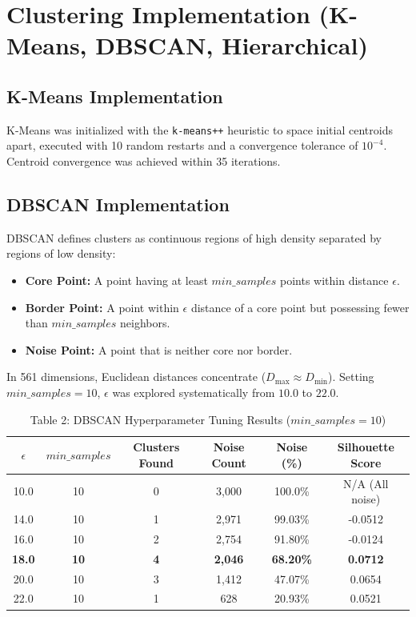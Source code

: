 \documentclass[12pt,a4paper]{article}
\begin{document}
\section{Clustering Implementation (K-Means, DBSCAN, Hierarchical)}

\subsection{K-Means Implementation}
K-Means was initialized with the \texttt{k-means++} heuristic to space initial centroids apart, executed with 10 random restarts and a convergence tolerance of $10^{-4}$. Centroid convergence was achieved within 35 iterations.

\subsection{DBSCAN Implementation}
DBSCAN defines clusters as continuous regions of high density separated by regions of low density:
\begin{itemize}
\item \textbf{Core Point:} A point having at least $min\_samples$ points within distance $\epsilon$.
\item \textbf{Border Point:} A point within $\epsilon$ distance of a core point but possessing fewer than $min\_samples$ neighbors.
\item \textbf{Noise Point:} A point that is neither core nor border.
\end{itemize}
In 561 dimensions, Euclidean distances concentrate ($D_{\max} \approx D_{\min}$). Setting $min\_samples = 10$, $\epsilon$ was explored systematically from $10.0$ to $22.0$.

\begin{table}[H]
\centering
\caption{Table 2: DBSCAN Hyperparameter Tuning Results ($min\_samples = 10$)}
\label{tab:dbscan}
\begin{tabular}{|c|c|c|c|c|c|}
\hline
\textbf{$\epsilon$} & \textbf{$min\_samples$} & \textbf{Clusters Found} & \textbf{Noise Count} & \textbf{Noise (\%)} & \textbf{Silhouette Score} \\ \hline
10.0 & 10 & 0 & 3,000 & 100.0\% & N/A (All noise) \\ \hline
14.0 & 10 & 1 & 2,971 & 99.03\% & -0.0512 \\ \hline
16.0 & 10 & 2 & 2,754 & 91.80\% & -0.0124 \\ \hline
\textbf{18.0} & \textbf{10} & \textbf{4} & \textbf{2,046} & \textbf{68.20\%} & \textbf{0.0712} \\ \hline
20.0 & 10 & 3 & 1,412 & 47.07\% & 0.0654 \\ \hline
22.0 & 10 & 1 & 628 & 20.93\% & 0.0521 \\ \hline
\end{tabular}
\end{table}
\end{document}
